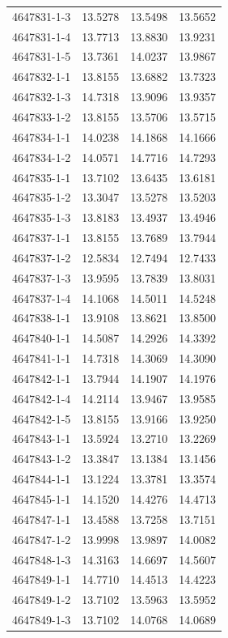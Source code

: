 \begin{longtable}{lrrr}
4647831-1-3 & 13.5278 & 13.5498 & 13.5652 \\
4647831-1-4 & 13.7713 & 13.8830 & 13.9231 \\
4647831-1-5 & 13.7361 & 14.0237 & 13.9867 \\
4647832-1-1 & 13.8155 & 13.6882 & 13.7323 \\
4647832-1-3 & 14.7318 & 13.9096 & 13.9357 \\
4647833-1-2 & 13.8155 & 13.5706 & 13.5715 \\
4647834-1-1 & 14.0238 & 14.1868 & 14.1666 \\
4647834-1-2 & 14.0571 & 14.7716 & 14.7293 \\
4647835-1-1 & 13.7102 & 13.6435 & 13.6181 \\
4647835-1-2 & 13.3047 & 13.5278 & 13.5203 \\
4647835-1-3 & 13.8183 & 13.4937 & 13.4946 \\
4647837-1-1 & 13.8155 & 13.7689 & 13.7944 \\
4647837-1-2 & 12.5834 & 12.7494 & 12.7433 \\
4647837-1-3 & 13.9595 & 13.7839 & 13.8031 \\
4647837-1-4 & 14.1068 & 14.5011 & 14.5248 \\
4647838-1-1 & 13.9108 & 13.8621 & 13.8500 \\
4647840-1-1 & 14.5087 & 14.2926 & 14.3392 \\
4647841-1-1 & 14.7318 & 14.3069 & 14.3090 \\
4647842-1-1 & 13.7944 & 14.1907 & 14.1976 \\
4647842-1-4 & 14.2114 & 13.9467 & 13.9585 \\
4647842-1-5 & 13.8155 & 13.9166 & 13.9250 \\
4647843-1-1 & 13.5924 & 13.2710 & 13.2269 \\
4647843-1-2 & 13.3847 & 13.1384 & 13.1456 \\
4647844-1-1 & 13.1224 & 13.3781 & 13.3574 \\
4647845-1-1 & 14.1520 & 14.4276 & 14.4713 \\
4647847-1-1 & 13.4588 & 13.7258 & 13.7151 \\
4647847-1-2 & 13.9998 & 13.9897 & 14.0082 \\
4647848-1-3 & 14.3163 & 14.6697 & 14.5607 \\
4647849-1-1 & 14.7710 & 14.4513 & 14.4223 \\
4647849-1-2 & 13.7102 & 13.5963 & 13.5952 \\
4647849-1-3 & 13.7102 & 14.0768 & 14.0689 \\

\end{longtable}

